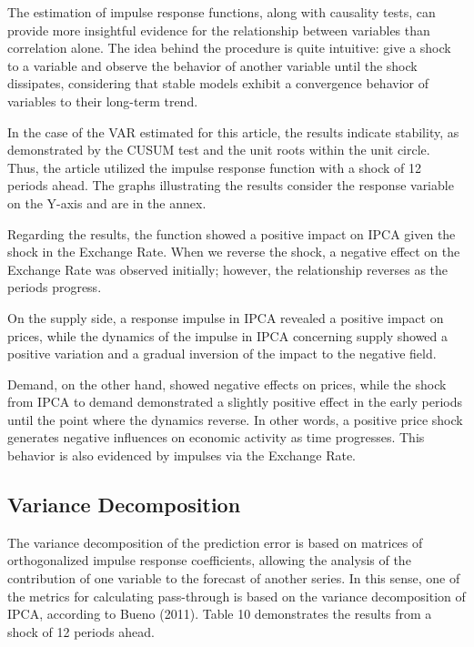 \documentclass[12pt]{article}
\begin{document}
The estimation of impulse response functions, along with causality
tests, can provide more insightful evidence for the relationship between
variables than correlation alone. The idea behind the procedure is quite
intuitive: give a shock to a variable and observe the behavior of
another variable until the shock dissipates, considering that stable
models exhibit a convergence behavior of variables to their long-term
trend.

In the case of the VAR estimated for this article, the results indicate
stability, as demonstrated by the CUSUM test and the unit roots within
the unit circle. Thus, the article utilized the impulse response
function with a shock of 12 periods ahead. The graphs illustrating the
results consider the response variable on the Y-axis and are in the
annex.

Regarding the results, the function showed a positive impact on IPCA
given the shock in the Exchange Rate. When we reverse the shock, a
negative effect on the Exchange Rate was observed initially; however,
the relationship reverses as the periods progress.

On the supply side, a response impulse in IPCA revealed a positive
impact on prices, while the dynamics of the impulse in IPCA concerning
supply showed a positive variation and a gradual inversion of the impact
to the negative field.

Demand, on the other hand, showed negative effects on prices, while the
shock from IPCA to demand demonstrated a slightly positive effect in the
early periods until the point where the dynamics reverse. In other
words, a positive price shock generates negative influences on economic
activity as time progresses. This behavior is also evidenced by impulses
via the Exchange Rate.

\hypertarget{variance-decomposition}{%
\subsection{Variance Decomposition}\label{variance-decomposition}}

The variance decomposition of the prediction error is based on matrices
of orthogonalized impulse response coefficients, allowing the analysis
of the contribution of one variable to the forecast of another series.
In this sense, one of the metrics for calculating pass-through is based
on the variance decomposition of IPCA, according to Bueno (2011). Table
10 demonstrates the results from a shock of 12 periods ahead.
\end{document}
